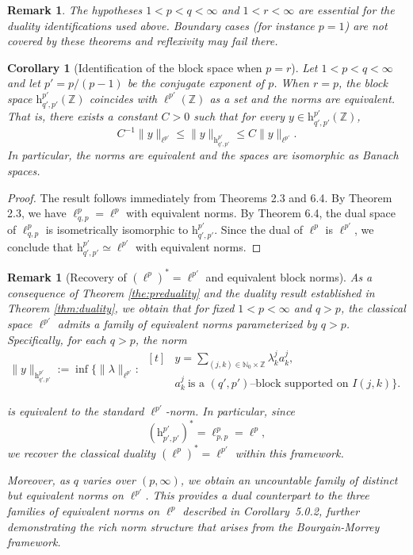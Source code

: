 \documentclass[preprint,12pt]{elsarticle}
\newtheorem{corollary}{Corollary}[theorem]
\newtheorem{remark}[theorem]{Remark}
\begin{document}
\begin{remark}
The hypotheses $1<p<q<\infty$ and $1<r<\infty$ are essential for the duality identifications used above. Boundary cases (for instance $p=1$) are not covered by these theorems and reflexivity may fail there.
\end{remark}

\begin{corollary}[Identification of the block space when \(p = r\)]\label{reflex:blockr=p}
Let \(1 < p < q < \infty\) and let \(p' = p/(p-1)\) be the conjugate exponent of \(p\). 
When $r=p$, the block space $\mathrm{h}^{p'}_{q',p'}(\mathbb Z)$ coincides with $\ell^{p'}(\mathbb Z)$ as a set and the norms are equivalent.
That is, there exists a constant \(C > 0\) such that for every \(y \in \mathrm{h}^{p'}_{q', p'}(\mathbb{Z})\),
\[
C^{-1} \|y\|_{\ell^{p'}} \leq \|y\|_{\mathrm{h}^{p'}_{q', p'}} \leq C \|y\|_{\ell^{p'}}.
\]
In particular, the norms are equivalent and the spaces are isomorphic as Banach spaces.
\end{corollary}
\begin{proof}
The result follows immediately from Theorems 2.3 and 6.4. 
By Theorem 2.3, we have \(\ell^{p}_{q,p} = \ell^{p}\) with equivalent norms. 
By Theorem 6.4, the dual space of \(\ell^{p}_{q,p}\) is isometrically isomorphic to \(\mathrm{h}^{p'}_{q', p'}\). 
Since the dual of \(\ell^{p}\) is \(\ell^{p'}\), we conclude that \(\mathrm{h}^{p'}_{q', p'} \simeq \ell^{p'}\) with equivalent norms.
\end{proof}

\begin{remark}[Recovery of $(\ell^p)^*=\ell^{p'}$ and equivalent block norms]
As a consequence of Theorem \ref{the:preduality} and the duality result established in Theorem \ref{thm:duality}, we obtain that for fixed $1 < p < \infty$ and $q > p$, the classical space $\ell^{p'}$ admits a family of equivalent norms parameterized by $q > p$. Specifically, for each $q > p$, the norm
\[
\|y\|_{\mathrm{h}^{p'}_{q',p'}}
:=\inf\Big\{\|\lambda\|_{\ell^{p'}}:\ 
\begin{aligned}[t]
&y=\sum_{(j,k)\in\mathbb N_0\times\mathbb Z}\lambda_k^j a_k^j,\\
& a_k^j\ \text{is a $(q',p')$--block supported on } I(j,k)\Big\}.
\end{aligned}
\]


is equivalent to the standard $\ell^{p'}$-norm. In particular, since 
\[
(\mathrm{h}^{p'}_{p',p'})^* = \ell_{p,p}^p = \ell^p,
\]
we recover the classical duality $(\ell^p)^* = \ell^{p'}$ within this framework.

Moreover, as $q$ varies over $(p, \infty)$, we obtain an uncountable family of distinct but equivalent norms on $\ell^{p'}$. This provides a dual counterpart to the three families of equivalent norms on $\ell^p$ described in Corollary~5.0.2, further demonstrating the rich norm structure that arises from the Bourgain-Morrey framework.
\end{remark}
\end{document}
